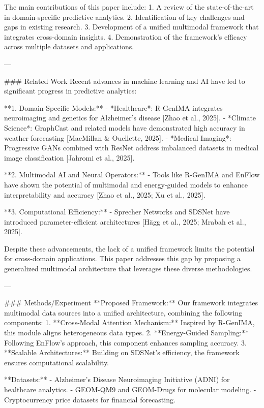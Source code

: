 The main contributions of this paper include:  
1. A review of the state-of-the-art in domain-specific predictive analytics.  
2. Identification of key challenges and gaps in existing research.  
3. Development of a unified multimodal framework that integrates cross-domain insights.  
4. Demonstration of the framework's efficacy across multiple datasets and applications.  

---

### Related Work  
Recent advances in machine learning and AI have led to significant progress in predictive analytics:  

**1. Domain-Specific Models:**  
- *Healthcare*: R-GenIMA integrates neuroimaging and genetics for Alzheimer's disease [Zhao et al., 2025].  
- *Climate Science*: GraphCast and related models have demonstrated high accuracy in weather forecasting [MacMillan & Ouellette, 2025].  
- *Medical Imaging*: Progressive GANs combined with ResNet address imbalanced datasets in medical image classification [Jahromi et al., 2025].  

**2. Multimodal AI and Neural Operators:**  
- Tools like R-GenIMA and EnFlow have shown the potential of multimodal and energy-guided models to enhance interpretability and accuracy [Zhao et al., 2025; Xu et al., 2025].  

**3. Computational Efficiency:**  
- Sprecher Networks and SDSNet have introduced parameter-efficient architectures [Hägg et al., 2025; Mrabah et al., 2025].  

Despite these advancements, the lack of a unified framework limits the potential for cross-domain applications. This paper addresses this gap by proposing a generalized multimodal architecture that leverages these diverse methodologies.  

---

### Methods/Experiment  
**Proposed Framework:**  
Our framework integrates multimodal data sources into a unified architecture, combining the following components:  
1. **Cross-Modal Attention Mechanism:** Inspired by R-GenIMA, this module aligns heterogeneous data types.  
2. **Energy-Guided Sampling:** Following EnFlow's approach, this component enhances sampling accuracy.  
3. **Scalable Architectures:** Building on SDSNet's efficiency, the framework ensures computational scalability.  

**Datasets:**  
- Alzheimer's Disease Neuroimaging Initiative (ADNI) for healthcare analytics.  
- GEOM-QM9 and GEOM-Drugs for molecular modeling.  
- Cryptocurrency price datasets for financial forecasting.  

